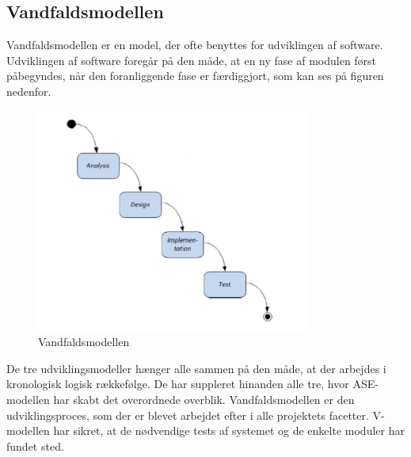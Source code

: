 \subsection{Vandfaldsmodellen}
Vandfaldsmodellen er en model, der ofte benyttes for udviklingen af software. Udviklingen af software foregår på den måde, at en ny fase af modulen først påbegyndes, når den foranliggende fase er færdiggjort, som kan ses på figuren nedenfor. 
\begin{figure}[H]
	\centering
	\includegraphics[width=0.8\textwidth]{Figurer/vfmodel}
	\caption{Vandfaldsmodellen}
\end{figure}
De tre udviklingsmodeller hænger alle sammen på den måde, at der arbejdes i kronologisk logisk rækkefølge. De har suppleret hinanden alle tre, hvor ASE-modellen har skabt det overordnede overblik. Vandfaldsmodellen er den udviklingsproces, som der er blevet arbejdet efter i alle projektets facetter. V-modellen har sikret, at de nødvendige tests af systemet og de enkelte moduler har fundet sted. 



